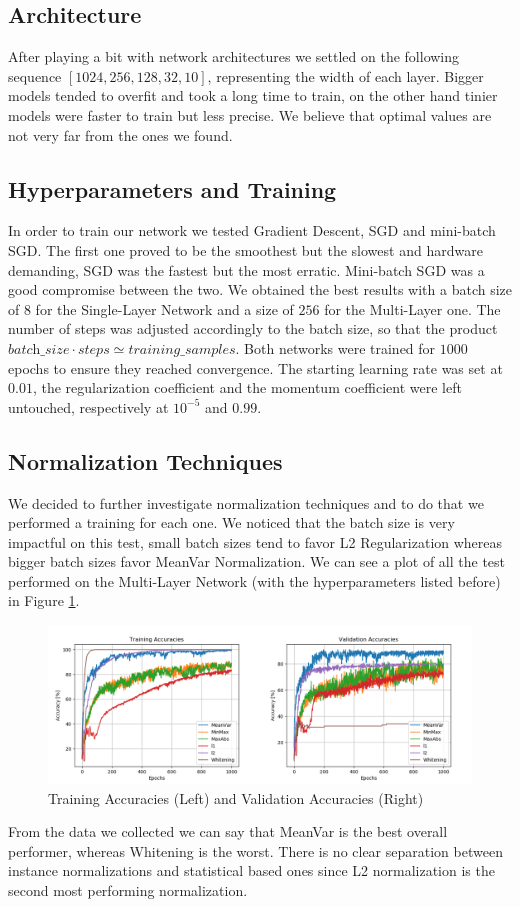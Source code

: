 \documentclass[10pt,a4paper]{report}
\begin{document}
\subsection{Architecture}
After playing a bit with network architectures we settled on the following sequence $[1024, 256, 128, 32, 10]$, representing the width of each layer. Bigger models tended to overfit and took a long time to train, on the other hand tinier models were faster to train but less precise. We believe that optimal values are not very far from the ones we found.
\subsection{Hyperparameters and Training}
In order to train our network we tested Gradient Descent, SGD and mini-batch SGD. The first one proved to be the smoothest but the slowest and hardware demanding, SGD was the fastest but the most erratic. Mini-batch SGD was a good compromise between the two. We obtained the best results with a batch size of $8$ for the Single-Layer Network and a size of $256$ for the Multi-Layer one. The number of steps was adjusted accordingly to the batch size, so that the product $\textit{batch\_size} \cdot \textit{steps} \simeq \textit{training\_samples}$. Both networks were trained for $1000$ epochs to ensure they reached convergence. The starting learning rate was set at $0.01$, the regularization coefficient and the momentum coefficient were left untouched, respectively at $10^{-5}$ and $0.99$. 
\subsection{Normalization Techniques}
We decided to further investigate normalization techniques and to do that we performed a training for each one. We noticed that the batch size is very impactful on this test, small batch sizes tend to favor L2 Regularization whereas bigger batch sizes favor MeanVar Normalization. We can see a plot of all the test performed on the Multi-Layer Network (with the hyperparameters listed before) in Figure \ref{fig:norm_test}.
\begin{figure}[!ht]
\centering
\includegraphics[width=\linewidth]{accs.png}
\caption{Training Accuracies (Left) and Validation Accuracies (Right)}
\label{fig:norm_test}
\end{figure}
From the data we collected we can say that MeanVar is the best overall performer, whereas Whitening is the worst. There is no clear separation between instance normalizations and statistical based ones since L2 normalization is the second most performing normalization.  
\end{document}
